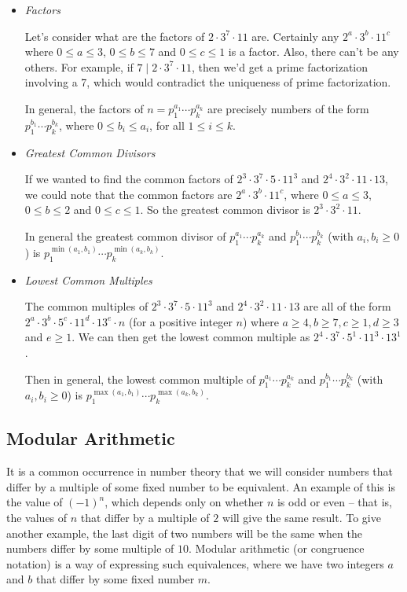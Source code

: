 \begin{itemize}
	\item \emph{Factors}
	
	Let's consider what are the factors of $2 \cdot 3^7 \cdot 11$ are. Certainly any $2^a \cdot 3^b \cdot 11^c$ where $0 \leq a \leq 3$, $0 \leq b \leq 7$ and $0 \leq c \leq 1$ is a factor. Also, there can't be any others. For example, if $7 \mid 2 \cdot 3^7 \cdot 11$, then we'd get a prime factorization involving a 7, which would contradict the uniqueness of prime factorization.

	In general, the factors of $n = p_1^{a_1} \cdots p_k^{a_k}$ are precisely numbers of the form $p_1^{b_1} \cdots p_k^{b_k}$, where $0 \leq b_i \leq a_i$, for all $1 \leq i \leq k$.

	\item \emph{Greatest Common Divisors}
	
	If we wanted to find the common factors of $2^3 \cdot 3^7 \cdot 5 \cdot 11^3$ and $2^4 \cdot 3^2 \cdot 11 \cdot 13$, we could note that the common factors are $2^a \cdot 3^b \cdot 11^c$, where $0 \leq a \leq 3$, $0 \leq b \leq 2$ and $0 \leq c \leq 1$.
	So the greatest common divisor is $2^3 \cdot 3^2 \cdot 11$.

	In general the greatest common divisor of $p_1^{a_1} \cdots p_k^{a_k}$ and $p_1^{b_1} \cdots p_k^{b_k}$ (with $a_i, b_i \geq 0$) is $p_1^{\min(a_1, b_1)} \cdots p_k^{\min(a_k, b_k)}$.

	\item \emph{Lowest Common Multiples}
	
	The common multiples of $2^3 \cdot 3^7 \cdot 5 \cdot 11^3$ and $2^4 \cdot 3^2 \cdot 11 \cdot 13$ are all of the form $2^a \cdot 3^b \cdot 5^c \cdot 11^d \cdot 13^e \cdot n$ (for a positive integer $n$) where $a \geq 4, b\geq 7, c\geq 1, d\geq 3$ and $e \geq 1$. We can then get the lowest common multiple as $2^4 \cdot 3^7 \cdot 5^1 \cdot 11^3 \cdot 13^1$.

	Then in general, the lowest common multiple of $p_1^{a_1} \cdots p_k^{a_k}$ and $p_1^{b_1} \cdots p_k^{b_k}$ (with $a_i, b_i \geq 0$) is $p_1^{\max(a_1, b_1)} \cdots p_k^{\max(a_k, b_k)}$.
\end{itemize}



\subsection{Modular Arithmetic}

It is a common occurrence in number theory that we will consider numbers that differ by a multiple of some fixed number to be equivalent. 
An example of this is the value of $(-1)^n$, which depends only on whether $n$ is odd or even -- that is, the values of $n$ that differ by a multiple of $2$ will give the same result. To give another example, the last digit of two numbers will be the same when the numbers differ by some multiple of $10$. Modular arithmetic (or congruence notation) is a way of expressing such equivalences, where we have two integers $a$ and $b$ that differ by some fixed number $m$.

